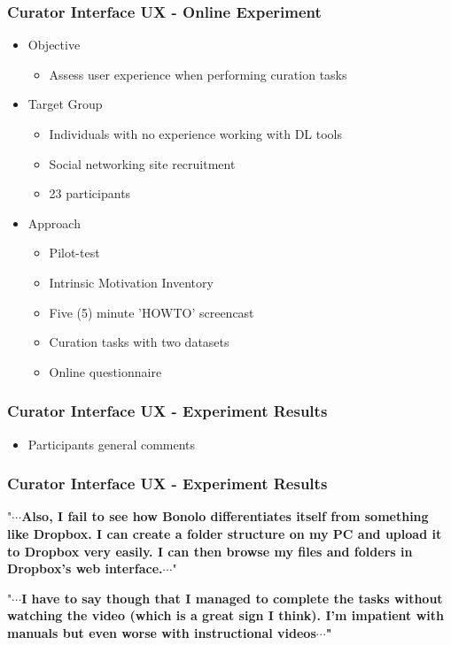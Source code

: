 \documentclass[xcolor=dvitex,t,11pt]{beamer}
\begin{document}
\begin{frame}[fragile]
\frametitle{Curator Interface UX - Online Experiment}
\begin{itemize}
\item Objective
\begin{itemize}
\item Assess user experience when performing curation tasks
\end{itemize}
\item Target Group
\begin{itemize}
\item Individuals with no experience working with DL tools
\item Social networking site recruitment
\item 23 participants
\end{itemize}
\item Approach
\begin{itemize}
\item Pilot-test
\item Intrinsic Motivation Inventory
\item Five (5) minute 'HOWTO' screencast
\item Curation tasks with two datasets
\item Online questionnaire
\end{itemize}
\end{itemize}
\end{frame}


\begin{frame}[fragile]
\frametitle{Curator Interface UX - Experiment Results}
\centering

\end{frame}


\begin{frame}[fragile]

\begin{itemize}
\item Participants general comments
\end{itemize}

\frametitle{Curator Interface UX - Experiment Results}
"\textbf{$\cdots$Also, I fail to see how Bonolo differentiates itself from something like Dropbox. I can create a folder structure on my PC and upload it to Dropbox very easily. I can then browse my files and folders in Dropbox's web interface.$\cdots$}"\\

\bigskip

"\textbf{$\cdots$I have to say though that I managed to complete the tasks without watching the video (which is a great sign I think). I'm impatient with manuals but even worse with instructional videos$\cdots$"}
\end{frame}
\end{document}
